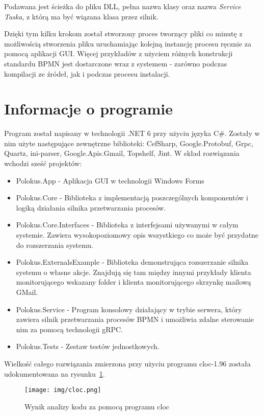 \documentclass[declaration,shortabstract,mgr]{iithesis}
\newcommand{\bpmn}{BPMN }
\begin{document}
\noindent Podawana jest ścieżka do pliku DLL, pełna nazwa klasy oraz nazwa \textit{Service Taska}, z którą ma być wiązana klasa przez silnik.

Dzięki tym kilku krokom został stworzony proces tworzący pliki co minutę z możliwością stworzenia pliku uruchamiając kolejną instancję procesu ręcznie za pomocą aplikacji GUI. Więcej przykładów z użyciem różnych konstrukcji standardu \bpmn jest dostarczone wraz z systemem - zarówno podczas kompilacji ze źródeł, jak i podczas procesu instalacji.


\section{Informacje o programie}

Program został napisany w technologii .NET 6 przy użyciu języka C\#. Zostały w nim użyte następujące zewnętrzne biblioteki: CefSharp, Google.Protobuf, Grpc, Quartz, ini-parser, Google.Apis.Gmail, Topshelf, Jint. W skład rozwiązania wchodzi sześć projektów:

\begin{itemize}
    \item Polokus.App - Aplikacja GUI w technologii Windows Forms
    \item Polokus.Core - Biblioteka z implementacją poszczególnych komponentów i logiką działania silnika przetwarzania procesów.
    \item Polokus.Core.Interfaces - Biblioteka z interfejsami używanymi w całym systemie. Zawiera wysokopoziomowy opis wszystkiego co może być przydatne do rozszerzania systemu.
    \item Polokus.ExternalsExample - Biblioteka demonstrująca rozszerzanie silnika systemu o własne akcje. Znajdują się tam między innymi przykłady klienta monitorującego wskazany folder i klienta monitorującego skrzynkę mailową GMail.
    \item Polokus.Service - Program konsolowy działający w trybie serwera, który zawiera silnik przetwarzania procesów \bpmn i umożliwia zdalne sterowanie nim za pomocą technologii gRPC.
    \item Polokus.Tests - Zestaw testów jednostkowych.
\end{itemize}

 Wielkość całego rozwiązania zmierzona przy użyciu programu cloc-1.96 \cite{cloc} została udokumentowana na rysunku~\ref{fig:cloc}.

\begin{figure}[H]
    \texttt{[image: img/cloc.png]}
    \caption{Wynik analizy kodu za pomocą programu cloc}
    \label{fig:cloc}
\end{figure}
\end{document}
